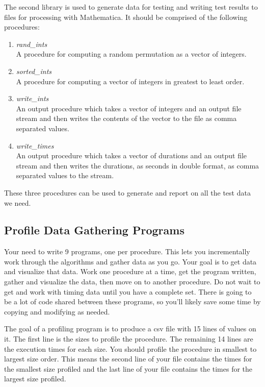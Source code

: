 \documentclass[]{tufte-handout}
\begin{document}
The second library is used to generate data for testing and writing test results to files for processing with Mathematica. It should be comprised of the following procedures:
\begin{enumerate}
\item \textit{rand\_ints} \\
A procedure for computing a random permutation as a vector of integers. 
\item \textit{sorted\_ints} \\
A procedure for computing a vector of integers in greatest to least order.
\item \textit{write\_ints} \\ 
An output procedure which takes a vector of integers and an output file stream and then writes the contents of the vector to the file as comma separated values.
\item \textit{write\_times} \\
An output procedure which takes a vector of durations and an output file stream and then writes the durations, as seconds in double format, as comma separated values to the stream.
\end{enumerate}
These three procedures can be used to generate and report on all the test data we need. 

\subsection{Profile Data Gathering Programs}

Your need to write 9 programs, one per procedure. This lets you incrementally work through the algorithms and gather data as you go. Your goal is to get data and visualize that data. Work one procedure at a time, get the program written, gather and visualize the data, then move on to another procedure. Do not wait to get and work with timing data until you have a complete set. There is going to be a lot of code shared between these programs, so you'll likely save some time by copying and modifying as needed. 

The goal of a profiling program is to produce a csv file with 15 lines of values on it. The first line is the sizes to profile the procedure. The remaining 14 lines are the execution times for each size. You should profile the procedure in smallest to largest size order. This means the second line of your file contains the times for the smallest size profiled and the last line of your file contains the times for the largest size profiled.
\end{document}
